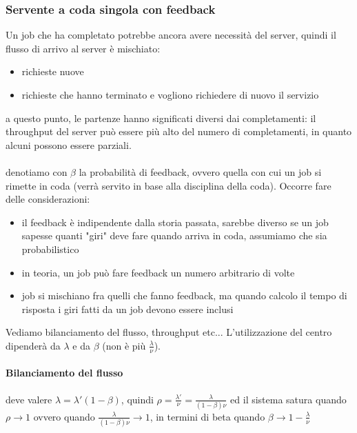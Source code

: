 \documentclass{article}
\begin{document}
\subsubsection{Servente a coda singola con feedback}
Un job che ha completato potrebbe ancora avere necessità del server, quindi il flusso di arrivo al server è mischiato:
\begin{itemize}
\item richieste nuove
\item richieste che hanno terminato e vogliono richiedere di nuovo il servizio
\end{itemize}
a questo punto, le partenze hanno significati diversi dai completamenti: il throughput del server può essere più alto del numero di completamenti, in quanto alcuni possono essere parziali.\\
\\ denotiamo con $\beta$ la probabilità di feedback, ovvero quella con cui un job si rimette in coda (verrà servito in base alla disciplina della coda). Occorre fare delle considerazioni:
\begin{itemize}
\item il feedback è indipendente dalla storia passata, sarebbe diverso se un job sapesse quanti "giri" deve fare quando arriva in coda, assumiamo che sia probabilistico
\item in teoria, un job può fare feedback un numero arbitrario di volte
\item job si mischiano fra quelli che fanno feedback, ma quando calcolo il tempo di risposta i giri fatti da un job devono essere inclusi
\end{itemize}
Vediamo bilanciamento del flusso, throughput etc... L'utilizzazione del centro dipenderà da $\lambda$ e da $\beta$ (non è più $\frac{\lambda}{\nu}$).
\paragraph{Bilanciamento del flusso} deve valere $\lambda = \lambda'(1 - \beta)$, quindi $\rho = \frac{\lambda'}{\nu} = \frac{\lambda}{(1 - \beta)\nu}$ ed il sistema satura quando $\rho \longrightarrow 1$ ovvero quando $\frac{\lambda}{(1 - \beta)\nu} \longrightarrow 1$, in termini di beta quando $\beta \longrightarrow 1 - \frac{\lambda}{\nu}$
\end{document}
